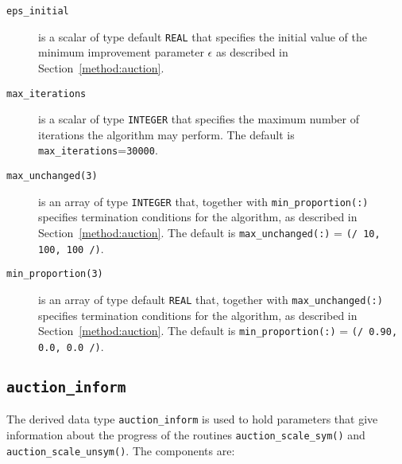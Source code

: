 \begin{description}

\item[\texttt{eps\_initial}] is a scalar of type default \texttt{REAL} that specifies the initial value of the minimum improvement parameter $\epsilon$ as described in Section~\ref{method:auction}.

\item[\texttt{max\_iterations}] is a scalar of type \texttt{INTEGER} that specifies the maximum number of iterations the algorithm may perform. The default is \texttt{max\_iterations}=\texttt{30000}.

\item[\texttt{max\_unchanged(3)}] is an array of type \texttt{INTEGER} that, together with \texttt{min\_proportion(:)} specifies termination conditions for the algorithm, as described in Section~\ref{method:auction}. The default is \texttt{max\_unchanged(:)} = \texttt{(/ 10, 100, 100 /)}.

\item[\texttt{min\_proportion(3)}] is an array of type default \texttt{REAL} that, together with \texttt{max\_unchanged(:)} specifies termination conditions for the algorithm, as described in Section~\ref{method:auction}. The default is \texttt{min\_proportion(:)} = \texttt{(/ 0.90, 0.0, 0.0 /)}.

\end{description}

\subsection{\texttt{auction\_inform}} \label{type:auction_inform}

The derived data type \texttt{auction\_inform} is used to hold parameters that
give information about the progress of the routines \texttt{auction\_scale\_sym()} and \texttt{auction\_scale\_unsym()}. The components are:

